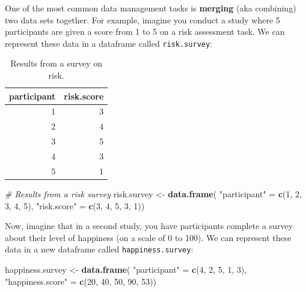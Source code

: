\documentclass[]{book}
\newenvironment{Shaded}{\begin{snugshade}}{\end{snugshade}}
\newcommand{\KeywordTok}[1]{\textcolor[rgb]{0.13,0.29,0.53}{\textbf{#1}}}
\newcommand{\DecValTok}[1]{\textcolor[rgb]{0.00,0.00,0.81}{#1}}
\newcommand{\StringTok}[1]{\textcolor[rgb]{0.31,0.60,0.02}{#1}}
\newcommand{\CommentTok}[1]{\textcolor[rgb]{0.56,0.35,0.01}{\textit{#1}}}
\newcommand{\NormalTok}[1]{#1}
\theoremstyle{definition}
\theoremstyle{definition}
\theoremstyle{remark}
\begin{document}
One of the most common data management tasks is \textbf{merging} (aka
combining) two data sets together. For example, imagine you conduct a
study where 5 participants are given a score from 1 to 5 on a risk
assessment task. We can represent these data in a dataframe called
\texttt{risk.survey}:

\begin{table}

\caption{\label{tab:unnamed-chunk-254}Results from a survey on risk.}
\centering
\begin{tabular}[t]{r|r}
\hline
participant & risk.score\\
\hline
1 & 3\\
\hline
2 & 4\\
\hline
3 & 5\\
\hline
4 & 3\\
\hline
5 & 1\\
\hline
\end{tabular}
\end{table}

\begin{Shaded}
\begin{Highlighting}[]
\CommentTok{# Results from a risk survey}
\NormalTok{risk.survey <-}\StringTok{ }\KeywordTok{data.frame}\NormalTok{(}
  \StringTok{"participant"}\NormalTok{ =}\StringTok{ }\KeywordTok{c}\NormalTok{(}\DecValTok{1}\NormalTok{, }\DecValTok{2}\NormalTok{, }\DecValTok{3}\NormalTok{, }\DecValTok{4}\NormalTok{, }\DecValTok{5}\NormalTok{),}
  \StringTok{"risk.score"}\NormalTok{ =}\StringTok{ }\KeywordTok{c}\NormalTok{(}\DecValTok{3}\NormalTok{, }\DecValTok{4}\NormalTok{, }\DecValTok{5}\NormalTok{, }\DecValTok{3}\NormalTok{, }\DecValTok{1}\NormalTok{))}
\end{Highlighting}
\end{Shaded}

Now, imagine that in a second study, you have participants complete a
survey about their level of happiness (on a scale of 0 to 100). We can
represent these data in a new dataframe called
\texttt{happiness.survey}:

\begin{Shaded}
\begin{Highlighting}[]
\NormalTok{happiness.survey <-}\StringTok{ }\KeywordTok{data.frame}\NormalTok{(}
  \StringTok{"participant"}\NormalTok{ =}\StringTok{ }\KeywordTok{c}\NormalTok{(}\DecValTok{4}\NormalTok{, }\DecValTok{2}\NormalTok{, }\DecValTok{5}\NormalTok{, }\DecValTok{1}\NormalTok{, }\DecValTok{3}\NormalTok{),}
  \StringTok{"happiness.score"}\NormalTok{ =}\StringTok{ }\KeywordTok{c}\NormalTok{(}\DecValTok{20}\NormalTok{, }\DecValTok{40}\NormalTok{, }\DecValTok{50}\NormalTok{, }\DecValTok{90}\NormalTok{, }\DecValTok{53}\NormalTok{))}
\end{Highlighting}
\end{Shaded}
\end{document}
